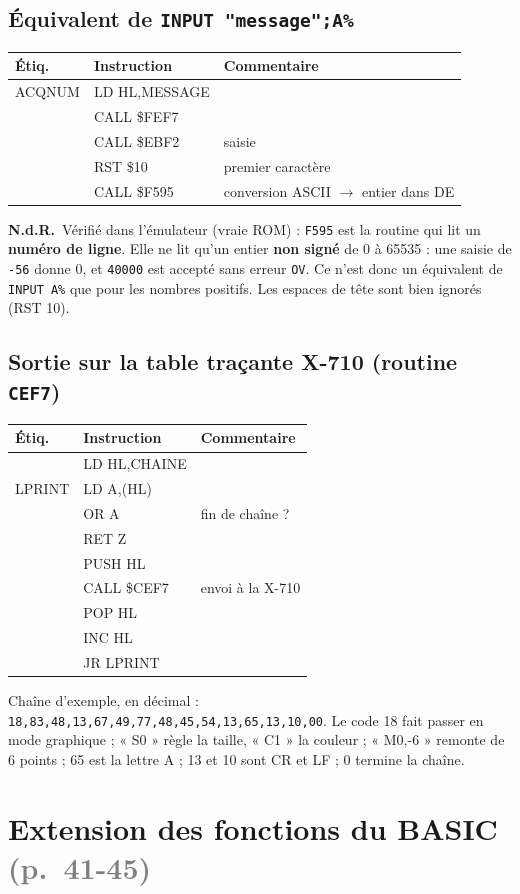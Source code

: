 \documentclass[a4paper,10pt]{article}
\makeatletter
\newcommand{\hex}[1]{\texttt{#1}}
\newcommand{\pg}[1]{\texorpdfstring{\textcolor{gray}{\small(p.~#1)}}{}}
\newcommand{\nota}[1]{\textcolor{red!60!black}{\small\textbf{N.d.R.}~#1}}
\newenvironment{src}
  {\small\begin{longtable}{@{}>{\ttfamily}l>{\ttfamily}l>{\raggedright\arraybackslash}p{8.6cm}@{}}
   \toprule
   \normalfont\bfseries Étiq. & \normalfont\bfseries Instruction & \textbf{Commentaire}\\
   \midrule\endhead
   \bottomrule\endfoot}
  {\end{longtable}}
\makeatother
\begin{document}
\subsection{Équivalent de \texttt{INPUT "message";A\%}}
\begin{src}
ACQNUM & LD HL,MESSAGE & \\
 & CALL \$FEF7 & \\
 & CALL \$EBF2 & saisie \\
 & RST \$10 & premier caractère \\
 & CALL \$F595 & conversion ASCII $\to$ entier dans DE \\
\end{src}
\nota{Vérifié dans l'émulateur (vraie ROM) : \hex{F595} est la routine qui lit
un \textbf{numéro de ligne}. Elle ne lit qu'un entier \textbf{non signé} de
0 à 65535 : une saisie de \texttt{-56} donne 0, et \texttt{40000} est accepté
sans erreur \texttt{OV}. Ce n'est donc un équivalent de
\texttt{INPUT A\%} que pour les nombres positifs. Les espaces de tête sont
bien ignorés (RST 10).}

\subsection{Sortie sur la table traçante X-710 (routine \hex{CEF7})}
\begin{src}
 & LD HL,CHAINE & \\
LPRINT & LD A,(HL) & \\
 & OR A & fin de chaîne ? \\
 & RET Z & \\
 & PUSH HL & \\
 & CALL \$CEF7 & envoi à la X-710 \\
 & POP HL & \\
 & INC HL & \\
 & JR LPRINT & \\
\end{src}
Chaîne d'exemple, en décimal :
\texttt{18,83,48,13,67,49,77,48,45,54,13,65,13,10,00}. Le code 18 fait
passer en mode graphique ; « S0 » règle la taille, « C1 » la couleur ;
« M0,-6 » remonte de 6 points ; 65 est la lettre A ; 13 et 10 sont CR et LF ;
0 termine la chaîne.

\section{Extension des fonctions du BASIC \pg{41-45}}
\end{document}
